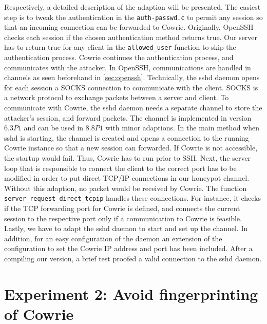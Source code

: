 Respectively, a detailed description of the adaption will be presented.
The easiest step is to tweak the authentication in the \verb|auth-passwd.c| to permit any session so that an incoming connection can be forwarded to Cowrie.
Originally, OpenSSH checks each session if the chosen authentication method returns true.
Our server has to return true for any client in the \verb|allowed_user| function to skip the authentication process.
Cowrie continues the authentication process, and communicates with the attacker.
In OpenSSH, communications are handled in channels as seen beforehand in \autoref{sec:openssh}.
Technically, the sshd daemon opens for each session a SOCKS connection to communicate with the client.
SOCKS is a network protocol to exchange packets between a server and client.
To communicate with Cowrie, the sshd daemon needs a separate channel to store the attacker's session, and forward packets.
The channel is implemented in version $6.3P1$ and can be used in $8.8P1$ with minor adaptions.
In the main method when sshd is starting, the channel is created and opens a connection to the running Cowrie instance so that a new session can forwarded.
If Cowrie is not accessible, the startup would fail.
Thus, Cowrie has to run prior to SSH.
Next, the server loop that is responsible to connect the client to the correct port has to be modified in order to put direct TCP/IP connections in our honeypot channel.
Without this adaption, no packet would be received by Cowrie.
The function \verb|server_request_direct_tcpip| handles these connections.
For instance, it checks if the TCP forwarding port for Cowrie is defined, and connects the current session to the respective port only if a communication to Cowrie is feasible.
Lastly, we have to adapt the sshd daemon to start and set up the channel. 
In addition, for an easy configuration of the daemon an extension of the configuration to set the Cowrie IP address and port has been included. 
After a compiling our version, a brief test proofed a valid connection to the sshd daemon. 

\section{Experiment 2: Avoid fingerprinting of Cowrie}


